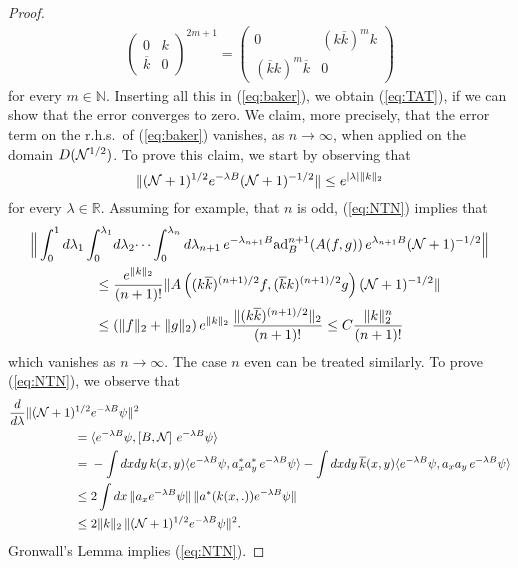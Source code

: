\documentclass[11pt,a4paper]{article}
\newcommand{\done}{}
\newcommand{\bR}{{\mathbb R}}
\newcommand{\bN}{{\mathbb N}}
\newcommand{\cN}{{\cal N}}
\begin{document}
\begin{proof}
\[\begin{split}
\left(  \begin{array}{ll} 0 &  k  \\ \overline{k} & 0 \end{array} \right)^{2m+1} = \left(  \begin{array}{ll} 0 & (k \overline{k})^m k \\  (\overline{k} k)^m \overline{k} & 0 \end{array} \right) 
\end{split} \]
for every $m \in \bN$. Inserting all this in (\ref{eq:baker}), we obtain (\ref{eq:TAT}), if we can show that the error converges to zero. We claim, more precisely, that the error term on the r.h.s.\ of (\ref{eq:baker}) vanishes, as $n \to \infty$, when applied on the domain $D(\cN^{1/2})$. 
To prove this claim, we start by observing that
\begin{equation}\label{eq:NTN} \| (\cN+1)^{1/2} e^{-\lambda B} (\cN+1)^{-1/2} \|%
\leq e^{|\lambda| \| k \|_2} \end{equation}
for every $\lambda \in \bR$. Assuming for example, that $n$ is odd, (\ref{eq:NTN}) implies that 
\[ \begin{split} \Big\| \int_0^1 d\lambda_1 \int_0^{\lambda_1} &d\lambda_2 \dots \int_0^{\lambda_{n}} d\lambda_{n+1} \, e^{-\lambda_{n+1} B}  \text{ad}_B^{n+1} (A (f,g)) \, e^{\lambda_{n+1} B} (\cN +1)^{-1/2} \Big\| \\ \leq \; & \frac{e^{\| k \|_2}}{(n+1)!}  \| A \left( (k\overline{k})^{(n+1)/2} f , (\overline{k} k)^{(n+1)/2} g \right) (\cN+1)^{-1/2} \| \\
\leq \; & (\| f \|_2 + \| g \|_2) \, e^{\| k \|_2} \, \frac{\| (k\overline{k})^{(n+1)/2} \|_2}{(n+1)!} \leq C \frac{\| k \|_2^n}{(n+1)!}\done 
\end{split}\]
which vanishes as $n \to \infty$. The case $n$ even can be treated similarly. To prove (\ref{eq:NTN}), we observe that 
\[ \begin{split} \frac{d}{d\lambda} \| (\cN+1)^{1/2} & e^{-\lambda B} \psi \|^2  \\
 =\; & \langle e^{-\lambda B} \psi, \left[ B , \cN \right] \, e^{-\lambda B} \psi \rangle \\
 = \; & -\int dx dy \,  k(x,y) \langle e^{-\lambda B} \psi, a_x^* a_y^* \, e^{-\lambda B} \psi \rangle - \int dx dy \, \overline{k} (x,y) \langle e^{-\lambda B} \psi, a_x a_y \, e^{-\lambda B} \psi \rangle \\ 
\leq \; & 2\int dx \, \| a_x e^{-\lambda B} \psi \| \, \| a^* (k(x,.)) e^{-\lambda B} \psi \| \\ 
\leq \; &2 \| k \|_2 \,  \| (\cN+1)^{1/2} e^{-\lambda B} \psi \|^2.
\end{split} \]
Gronwall's Lemma implies (\ref{eq:NTN}).   


\end{proof}
\end{document}
